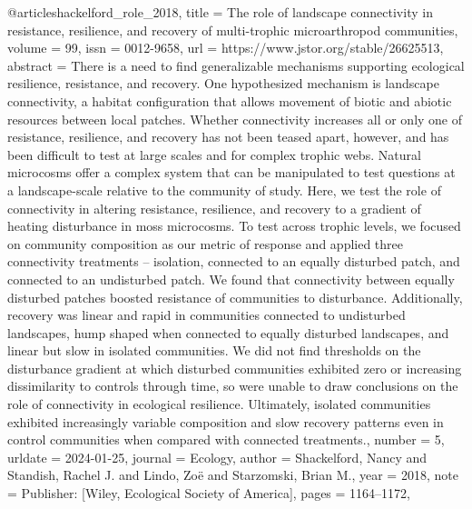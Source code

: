 {{{@article{shackelford_role_2018,
	title = {The role of landscape connectivity in resistance, resilience, and recovery of multi-trophic microarthropod communities},
	volume = {99},
	issn = {0012-9658},
	url = {https://www.jstor.org/stable/26625513},
	abstract = {There is a need to find generalizable mechanisms supporting ecological resilience, resistance, and recovery. One hypothesized mechanism is landscape connectivity, a habitat configuration that allows movement of biotic and abiotic resources between local patches. Whether connectivity increases all or only one of resistance, resilience, and recovery has not been teased apart, however, and has been difficult to test at large scales and for complex trophic webs. Natural microcosms offer a complex system that can be manipulated to test questions at a landscape-scale relative to the community of study. Here, we test the role of connectivity in altering resistance, resilience, and recovery to a gradient of heating disturbance in moss microcosms. To test across trophic levels, we focused on community composition as our metric of response and applied three connectivity treatments – isolation, connected to an equally disturbed patch, and connected to an undisturbed patch. We found that connectivity between equally disturbed patches boosted resistance of communities to disturbance. Additionally, recovery was linear and rapid in communities connected to undisturbed landscapes, hump shaped when connected to equally disturbed landscapes, and linear but slow in isolated communities. We did not find thresholds on the disturbance gradient at which disturbed communities exhibited zero or increasing dissimilarity to controls through time, so were unable to draw conclusions on the role of connectivity in ecological resilience. Ultimately, isolated communities exhibited increasingly variable composition and slow recovery patterns even in control communities when compared with connected treatments.},
	number = {5},
	urldate = {2024-01-25},
	journal = {Ecology},
	author = {Shackelford, Nancy and Standish, Rachel J. and Lindo, Zoë and Starzomski, Brian M.},
	year = {2018},
	note = {Publisher: [Wiley, Ecological Society of America]},
	pages = {1164--1172},
}

}}}
